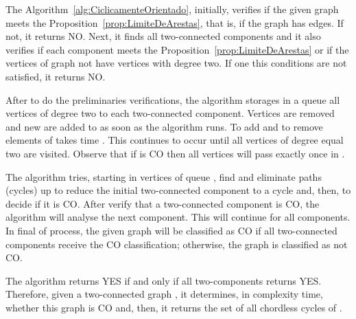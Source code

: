 \documentclass{lawcg}
\begin{document}
The Algorithm~\ref{alg:CiclicamenteOrientado}, initially, verifies if the given graph meets the Proposition~\ref{prop:LimiteDeArestas}, that is, if the graph has  edges. If not, it returns NO. Next, it finds all two-connected components and it also verifies if each component meets the Proposition~\ref{prop:LimiteDeArestas} or if the vertices of graph not have vertices with degree two. If one this conditions are not satisfied, it returns NO.

After to do the preliminaries verifications, the algorithm storages in a queue  all vertices of degree two to each two-connected component. Vertices are removed and new are added to  as soon as the algorithm runs. To add and to remove elements of  takes time . This continues to occur until all vertices of degree equal two are visited. Observe that if  is CO then all vertices will pass exactly once in .

The algorithm tries, starting in vertices of queue , find and eliminate paths (cycles) up to reduce the initial two-connected component to a cycle and, then, to decide if it is CO. After verify that a two-connected component is CO, the algorithm will analyse the next component. This will continue for all components. In final of process, the given graph will be classified as CO if all two-connected components receive the CO classification; otherwise, the graph is classified as not CO.

The algorithm returns YES if and only if all two-components returns YES. Therefore, given a two-connected graph , it determines, in  complexity time, whether this graph is CO and, then, it returns the set of all chordless cycles  of .
\end{document}
